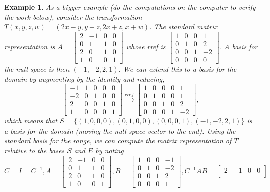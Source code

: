 \documentclass[10pt]{article}
\theoremstyle{plain}
\theoremstyle{box}
\newtheorem{example}{Example}
\begin{document}
\begin{example}
As a bigger example (do the computations on the computer to verify the work below), consider the transformation $T(x,y,z,w)=(2x-y,y+z,2x+z,x+w)$.  The standard matrix representation is 
$
A=
\begin{bmatrix}
 2 & -1 & 0 & 0 \\
 0 & 1 & 1 & 0 \\
 2 & 0 & 1 & 0 \\
 1 & 0 & 0 & 1
\end{bmatrix}
$
whose rref is
$
\begin{bmatrix}
 1 & 0 & 0 & 1 \\
 0 & 1 & 0 & 2 \\
 0 & 0 & 1 & -2 \\
 0 & 0 & 0 & 0
\end{bmatrix}
$. A basis for the null space is then $(-1,-2,2,1)$. We can extend this to a basis for the domain by augmenting by the identity and reducing, 
$$
\begin{bmatrix}
 -1 & 1 & 0 & 0 & 0 \\
 -2 & 0 & 1 & 0 & 0 \\
 2 & 0 & 0 & 1 & 0 \\
 1 & 0 & 0 & 0 & 1
\end{bmatrix}
\xrightarrow{rref}
\begin{bmatrix}
 1 & 0 & 0 & 0 & 1 \\
 0 & 1 & 0 & 0 & 1 \\
 0 & 0 & 1 & 0 & 2 \\
 0 & 0 & 0 & 1 & -2
\end{bmatrix},
$$ which means that $S=\{(1,0,0,0),(0,1,0,0),(0,0,0,1),(-1,-2,2,1)\}$ is a basis for the domain (moving the null space vector to the end). Using the standard basis for the range, we can compute the matrix representation of $T$ relative to the bases $S$ and $E$ by noting 
$$C=I=C^{-1},
A=
\begin{bmatrix}
 2 & -1 & 0 & 0 \\
 0 & 1 & 1 & 0 \\
 2 & 0 & 1 & 0 \\
 1 & 0 & 0 & 1
\end{bmatrix}, 
B=
\begin{bmatrix}
 1 & 0 & 0 & -1 \\
 0 & 1 & 0 & -2 \\
 0 & 0 & 1 & 2 \\
 0 & 0 & 0 & 1
\end{bmatrix},
C^{-1}AB= 
\begin{bmatrix}
 2 & -1 & 0 & 0 \\

\end{bmatrix}$$
\end{example}
\end{document}
